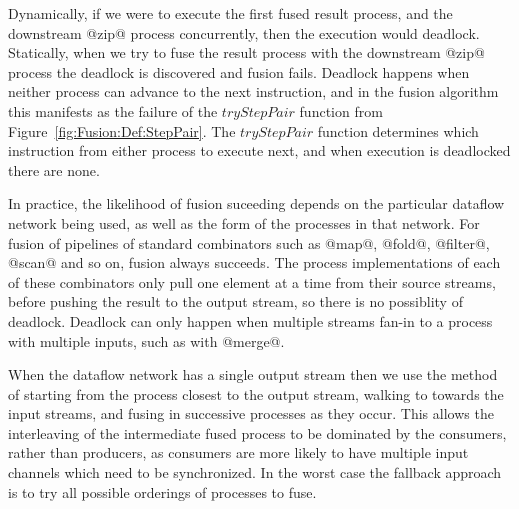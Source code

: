 Dynamically, if we were to execute the first fused result process, and the downstream @zip@ process concurrently, then the execution would deadlock. Statically, when we try to fuse the result process with the downstream @zip@ process the deadlock is discovered and fusion fails. Deadlock happens when neither process can advance to the next instruction, and in the fusion algorithm this manifests as the failure of the $tryStepPair$ function from Figure~\ref{fig:Fusion:Def:StepPair}. The $tryStepPair$ function determines which instruction from either process to execute next, and when execution is deadlocked there are none.




In practice, the likelihood of fusion suceeding depends on the particular dataflow network being used, as well as the form of the processes in that network. For fusion of pipelines of standard combinators such as @map@, @fold@, @filter@, @scan@ and so on, fusion always succeeds. The process implementations of each of these combinators only pull one element at a time from their source streams, before pushing the result to the output stream, so there is no possiblity of deadlock. Deadlock can only happen when multiple streams fan-in to a process with multiple inputs, such as with @merge@. 

When the dataflow network has a single output stream then we use the method of starting from the process closest to the output stream, walking to towards the input streams, and fusing in successive processes as they occur. This allows the interleaving of the intermediate fused process to be dominated by the consumers, rather than producers, as consumers are more likely to have multiple input channels which need to be synchronized. In the worst case the fallback approach is to try all possible orderings of processes to fuse.

